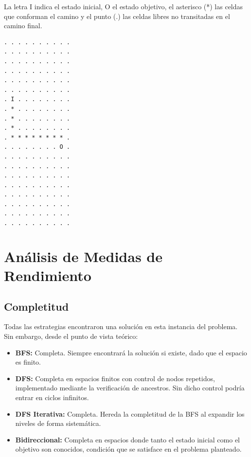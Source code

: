 \documentclass{article}
\begin{document}
La letra I indica el estado inicial, O el estado objetivo, el asterisco
(*) las celdas que conforman el camino y el punto (.) las celdas libres
no transitadas en el camino final.

\begin{verbatim}
. . . . . . . . . .
. . . . . . . . . .
. . . . . . . . . .
. . . . . . . . . .
. . . . . . . . . .
. . . . . . . . . .
. I . . . . . . . .
. * . . . . . . . .
. * . . . . . . . .
. * . . . . . . . .
. * * * * * * * * .
. . . . . . . . O .
. . . . . . . . . .
. . . . . . . . . .
. . . . . . . . . .
. . . . . . . . . .
. . . . . . . . . .
. . . . . . . . . .
. . . . . . . . . .
. . . . . . . . . .
\end{verbatim}


\section{Análisis de Medidas de Rendimiento}

\subsection{Completitud}

Todas las estrategias encontraron una solución en esta instancia del
problema. Sin embargo, desde el punto de vista teórico:

\begin{itemize}

    \item \textbf{BFS:} Completa. Siempre encontrará la solución si
    existe, dado que el espacio es finito.

    \item \textbf{DFS:} Completa en espacios finitos con control de
    nodos repetidos, implementado mediante la verificación de
    ancestros. Sin dicho control podría entrar en ciclos infinitos.

    \item \textbf{DFS Iterativa:} Completa. Hereda la completitud de
    la BFS al expandir los niveles de forma sistemática.

    \item \textbf{Bidireccional:} Completa en espacios donde tanto
    el estado inicial como el objetivo son conocidos, condición que
    se satisface en el problema planteado.

\end{itemize}
\end{document}
